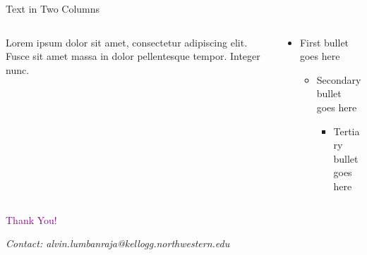\documentclass[10pt,xcolor={table,dvipsnames},t,aspectratio=169]{beamer}
\begin{document}
\begin{frame}{Text in Two Columns}
\begin{columns}[T]

\begin{column}{0.49\textwidth}
Lorem ipsum dolor sit amet, consectetur adipiscing elit. Fusce sit amet massa in dolor pellentesque tempor. Integer nunc. 
\end{column}

\begin{column}{0.49\textwidth}
\begin{itemize}
\item First bullet goes here
  \begin{itemize}
  \item Secondary bullet goes here
    \begin{itemize}
    \item Tertiary bullet goes here
    \end{itemize}
  \end{itemize}
\end{itemize}
\end{column}

\end{columns}
\end{frame}

\begin{frame}
\begin{center}
{\huge\rmfamily \textcolor{Purple}{Thank You!}}

\vspace{2em}
\textit{\small Contact: alvin.lumbanraja@kellogg.northwestern.edu}
\end{center}

\end{frame}
\end{document}
